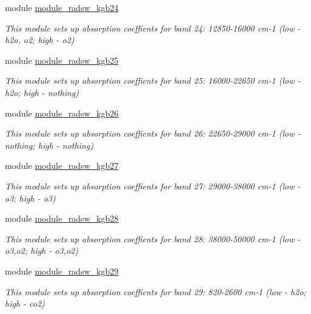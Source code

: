 \begin{DoxyCompactItemize}
module \hyperlink{namespacemodule__radsw__kgb24}{module\+\_\+radsw\+\_\+kgb24}
\begin{DoxyCompactList}\small\item\em This module sets up absorption coeffients for band 24\+: 12850-\/16000 cm-\/1 (low -\/ h2o, o2; high -\/ o2) \end{DoxyCompactList}\item 
module \hyperlink{namespacemodule__radsw__kgb25}{module\+\_\+radsw\+\_\+kgb25}
\begin{DoxyCompactList}\small\item\em This module sets up absorption coeffients for band 25\+: 16000-\/22650 cm-\/1 (low -\/ h2o; high -\/ nothing) \end{DoxyCompactList}\item 
module \hyperlink{namespacemodule__radsw__kgb26}{module\+\_\+radsw\+\_\+kgb26}
\begin{DoxyCompactList}\small\item\em This module sets up absorption coeffients for band 26\+: 22650-\/29000 cm-\/1 (low -\/ nothing; high -\/ nothing) \end{DoxyCompactList}\item 
module \hyperlink{namespacemodule__radsw__kgb27}{module\+\_\+radsw\+\_\+kgb27}
\begin{DoxyCompactList}\small\item\em This module sets up absorption coeffients for band 27\+: 29000-\/38000 cm-\/1 (low -\/ o3; high -\/ o3) \end{DoxyCompactList}\item 
module \hyperlink{namespacemodule__radsw__kgb28}{module\+\_\+radsw\+\_\+kgb28}
\begin{DoxyCompactList}\small\item\em This module sets up absorption coeffients for band 28\+: 38000-\/50000 cm-\/1 (low -\/ o3,o2; high -\/ o3,o2) \end{DoxyCompactList}\item 
module \hyperlink{namespacemodule__radsw__kgb29}{module\+\_\+radsw\+\_\+kgb29}
\begin{DoxyCompactList}\small\item\em This module sets up absorption coeffients for band 29\+: 820-\/2600 cm-\/1 (low -\/ h2o; high -\/ co2) \end{DoxyCompactList}\end{DoxyCompactItemize}

